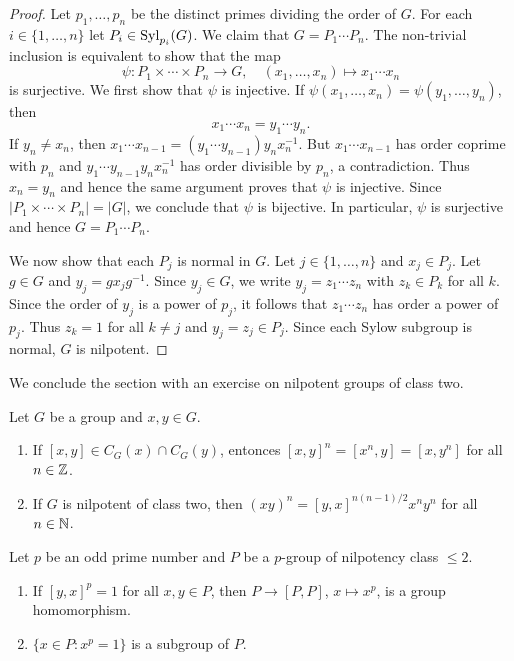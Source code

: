 \begin{proof}
	Let $p_1,\dots,p_n$ be the distinct primes dividing the order of $G$. For each 
	$i\in\{1,\dots,n\}$ let $P_i\in\mathrm{Syl}_{p_i}(G)$. We claim that 
	$G=P_1\cdots P_n$. The non-trivial inclusion is equivalent to show that the map
	\[
		\psi\colon P_1\times\cdots\times P_n\to G,\quad
		(x_1,\dots,x_n)\mapsto x_1\cdots x_n
	\]
	is surjective. We first show that $\psi$ is injective. If 
	$\psi(x_1,\dots,x_n)=\psi(y_1,\dots,y_n)$, then  
	\[
		x_1\cdots
	x_n=y_1\cdots y_n. 
	\]
	If $y_n\ne x_n$, then $x_1\cdots x_{n-1}=(y_1\cdots
	y_{n-1})y_nx_n^{-1}$. But $x_1\cdots x_{n-1}$ has order coprime with 
	$p_n$ and $y_1\cdots y_{n-1}y_nx_n^{-1}$ has order divisible by $p_n$, a contradiction. 
	Thus $x_n=y_n$ and hence the same argument proves that $\psi$ is injective. 
	Since $|P_1\times\cdots\times
	P_n|=|G|$, we conclude that $\psi$ is bijective. In particular, $\psi$ is surjective and hence 
	$G=P_1\cdots P_n$.

	We now show that each $P_j$ is normal in $G$.  Let $j\in\{1,\dots,n\}$ and 
	$x_j\in P_j$. Let $g\in G$ and $y_j=gx_jg^{-1}$.  Since $y_j\in G$,
	we write $y_j=z_1\cdots z_n$ with $z_k\in P_k$ for all $k$. Since the order of 
	$y_j$ is a power of $p_j$, it follows that $z_1\cdots
	z_n$ has order a power of $p_j$. Thus $z_k=1$ for all $k\ne j$ and 
	$y_j=z_j\in P_j$. Since each Sylow subgroup is normal, $G$ is nilpotent. 
\end{proof}


We conclude the section with an exercise
on nilpotent groups of class two. 

\begin{exercise}
Let $G$ be a group and $x,y\in G$.  
\begin{enumerate}
	\item If $[x,y]\in C_G(x)\cap C_G(y)$, entonces
	$[x,y]^n=[x^n,y]=[x,y^n]$
	for all $n\in\mathbb{Z}$.
	\item If $G$ is nilpotent of class two, then $(xy)^n=[y,x]^{n(n-1)/2}x^ny^n$ 
	for all $n\in\mathbb{N}$.
\end{enumerate}	
\end{exercise}

\begin{exercise}
	Let $p$ be an odd prime number and  
	$P$ be a $p$-group of nilpotency class $\leq2$. 
	\begin{enumerate}
	\item 	If $[y,x]^p=1$ for all $x,y\in P$, then $P\to [P,P]$,
	$x\mapsto x^p$, is a group homomorphism. 
	\item $\{x\in P:x^p=1\}$ is a subgroup of $P$. 
	\end{enumerate}
\end{exercise}




